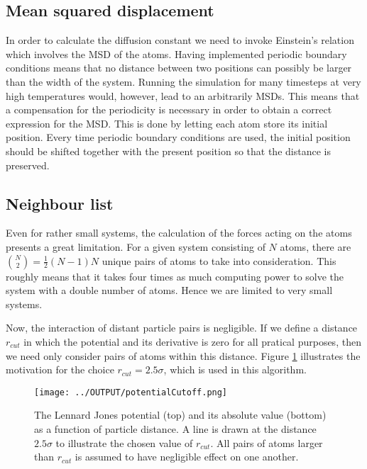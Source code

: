 \documentclass[twoside,utf8]{article}
\begin{document}
\begin{multicols}{2}
\subsection{Mean squared displacement}
In order to calculate the diffusion constant we need to invoke Einstein's relation which involves the MSD of the atoms. Having implemented periodic boundary conditions means that no distance between two positions can possibly be larger than the width of the system. Running the simulation for many timesteps at very high temperatures would, however, lead to an arbitrarily MSDs. This means that a compensation for the periodicity is necessary in order to obtain a correct expression for the MSD. This is done by letting each atom store its initial position. Every time periodic boundary conditions are used, the initial position should be shifted together with the present position so that the distance is preserved.




\subsection{Neighbour list}
Even for rather small systems, the calculation of the forces acting on the atoms presents a great limitation. For a given system consisting of $N$ atoms, there are $\binom{N}{2}=\frac{1}{2}(N-1)N$ unique pairs of atoms to take into consideration. This roughly means that it takes four times as much computing power to solve the system with a double number of atoms. Hence we are limited to very small systems. 

Now, the interaction of distant particle pairs is negligible. If we define a distance $r_{cut}$ in which the potential and its derivative is zero for all pratical purposes, then we need only consider pairs of atoms within this distance. Figure \ref*{LennardJonesRcut} illustrates the motivation for the choice $ r_{cut}=2.5 \sigma $, which is used in this algorithm. 


\begin{figure}[H]
\begin{center}
\texttt{[image: ../OUTPUT/potentialCutoff.png]}
\end{center}
\caption{
The Lennard Jones potential (top) and its absolute value (bottom) as a function of particle distance. A line is drawn at the distance $2.5\sigma$ to illustrate the chosen value of $r_{cut}$. All pairs of atoms larger than $r_{cut}$ is assumed to have negligible effect on one another.
}
\label{LennardJonesRcut}
\end{figure}



\end{multicols}
\end{document}

